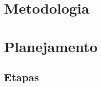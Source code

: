 \documentclass[11pt,twoside,a4paper]{article}
\begin{document}
\section{Metodologia}
\doublespacing

\newpage
\section{Planejamento}
\doublespacing
\subsection{Etapas}
\end{document}
